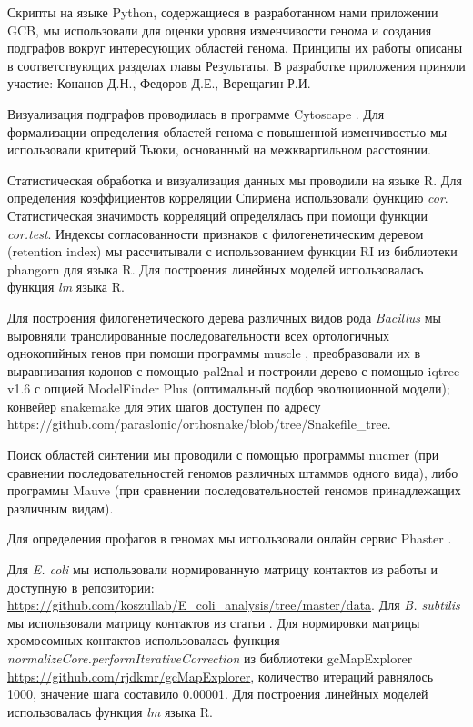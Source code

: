 Скрипты на языке Python, содержащиеся в разработанном нами приложении GCB, мы использовали для оценки уровня изменчивости генома и создания подграфов вокруг интересующих областей генома. Принципы их работы описаны в соответствующих разделах главы Результаты. В разработке приложения приняли участие: Конанов Д.Н., Федоров Д.Е., Верещагин Р.И.

Визуализация подграфов проводилась в программе Cytoscape \cite{smoot2011cytoscape}. Для формализации определения областей генома с повышенной изменчивостью мы использовали критерий Тьюки, основанный на межквартильном расстоянии.

Статистическая обработка и визуализация данных мы проводили на языке R. Для определения коэффициентов корреляции Спирмена использовали функцию \textit{cor}. Статистическая значимость корреляций определялась при помощи функции \textit{cor.test}. Индексы согласованности признаков с филогенетическим деревом (retention index) мы рассчитывали с использованием функции RI из библиотеки phangorn для языка R. Для построения линейных моделей использовалась функция \textit{lm} языка R.

Для построения филогенетического дерева различных видов рода \textit{Bacillus} мы выровняли транслированные последовательности всех ортологичных однокопийных генов при помощи программы muscle \cite{edgar2004muscle}, преобразовали их в выравнивания кодонов с помощью pal2nal и построили дерево с помощью iqtree v1.6 \cite{nguyen2015iq} с опцией ModelFinder Plus (оптимальный подбор эволюционной модели); конвейер snakemake для этих шагов доступен по адресу https://github.com/paraslonic/orthosnake/blob/tree/Snakefile\_tree. 

Поиск областей синтении мы проводили с помощью программы nucmer \cite{marccais2018mummer4}(при сравнении последовательностей геномов различных штаммов одного вида), либо программы Mauve \cite{darling2004mauve} (при сравнении последовательностей геномов принадлежащих различным видам).

Для определения профагов в геномах мы использовали онлайн сервис Phaster \cite{arndt2016phaster}. 

Для \textit{E. coli} мы использовали нормированную матрицу контактов из работы \cite{lioy2018multiscale} и доступную в репозитории: \url{https://github.com/koszullab/E_coli_analysis/tree/master/data}. Для \textit{B. subtilis} мы использовали матрицу контактов из статьи \cite{marbouty2015condensin}. Для нормировки матрицы хромосомных контактов использовалась функция  \textit{normalizeCore.performIterativeCorrection} из библиотеки gcMapExplorer \url{https://github.com/rjdkmr/gcMapExplorer}, количество итераций равнялось 1000, значение шага составило 0.00001. Для построения линейных моделей использовалась функция \textit{lm} языка R.


